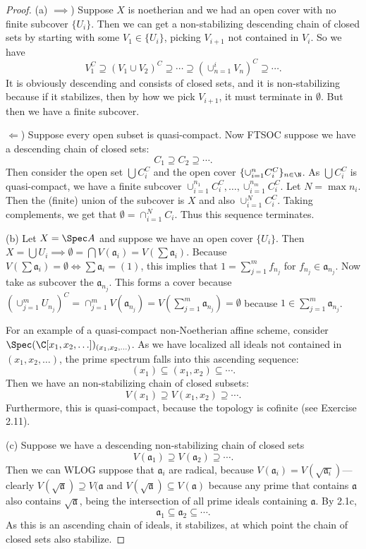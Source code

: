 \begin{proof}
	(a) $\implies $) Suppose $X $ is noetherian and we had an open cover with no finite subcover $\{U_i\}  $.
	Then we can get a non-stabilizing descending chain of closed sets by starting with some $V_1 \in \{U_i\}   $, picking $V_{i+1} $ not contained in $V_i $.
	So we have
	\[
		V_1^C \supseteq (V_1\cup V_{2})^C \supseteq \cdots \supseteq (\cup_{n = 1}^i V_n)^C \supseteq \cdots
	.\] 
	It is obviously descending and consists of closed sets, and it is non-stabilizing because if it stabilizes, then by how we pick $V_{i+1} $, it must terminate in $\emptyset $.
	But then we have a finite subcover.

	$\Leftarrow $) Suppose every open subset is quasi-compact.
	Now FTSOC suppose we have a descending chain of closed sets:
	\[
		C_{1} \supseteq C_{2} \supseteq \cdots
	.\] 
	Then consider the open set $\bigcup C_i^C $ and the open cover $\{\cup_{i=1}^n C_i^C\}_{n\in \N}   $.
	As $\bigcup C_i^C $ is quasi-compact, we have a finite subcover $\cup_{i=1}^{n_1} C_i^C, \ldots, \cup_{i=1}^{n_m}C_i^C $.
	Let $N = \max n_i $.
	Then the (finite) union of the subcover is $X $ and also $\cup_{i=1}^N C_i^C$.
	Taking complements, we get that $\emptyset = \cap_{i=1}^N C_i $.
	Thus this sequence terminates.

	(b) Let $X = \Spec A $ and suppose we have an open cover $\{U_i\} $.
	Then $X = \bigcup U_i \implies \emptyset = \bigcap V(\mathfrak{a}_i) = V(\sum \mathfrak{a}_i)$.
	Because $V(\sum \mathfrak{a}_i) = \emptyset \iff \sum \mathfrak{a}_i = (1) $, this implies that $1 = \sum_{j=1}^m f_{n_j} $ for $f_{n_j} \in \mathfrak{a}_{n_j} $.
	Now take as subcover the $\mathfrak{a}_{n_j} $.
	This forms a cover because $(\cup_{j=1}^m U_{n_j})^C = \cap_{j=1}^m V(\mathfrak{a}_{n_j}) = V(\sum_{j=1}^m \mathfrak{a}_{n_j}) = \emptyset$ because $1 \in \sum_{j=1}^m \mathfrak{a}_{n_j} $.

	For an example of a quasi-compact non-Noetherian affine scheme, consider $\Spec (\C[x_{1},x_{2},\ldots])_{(x_{1},x_{2},\ldots)} $.
	As we have localized all ideals not contained in $(x_{1},x_{2},\ldots) $, the prime spectrum falls into this ascending sequence:
	\[
		(x_{1}) \subseteq (x_{1},x_{2}) \subseteq \cdots
	.\] 
	Then we have an non-stabilizing chain of closed subsets:
	\[
		V(x_{1}) \supseteq V(x_{1},x_{2}) \supseteq \cdots
	.\] 
	Furthermore, this is quasi-compact, because the topology is cofinite (see Exercise 2.11).

	(c) Suppose we have a descending non-stabilizing chain of closed sets
	\[
		V(\mathfrak{a}_1) \supseteq V(\mathfrak{a}_2) \supseteq \cdots
	.\] 
	Then we can WLOG suppose that $\mathfrak{a}_i $ are radical, because $V(\mathfrak{a}_i) = V(\sqrt{\mathfrak{a}_i}) $---clearly $V(\sqrt{\mathfrak{a}} ) \supseteq V(\mathfrak{a} $ and $V(\sqrt{\mathfrak{a}} ) \subseteq V(\mathfrak{a}) $ because any prime that contains $\mathfrak{a} $ also contains $\sqrt{\mathfrak{a}}  $, being the intersection of all prime ideals containing $\mathfrak{a} $.
	By 2.1c,
	\[
		\mathfrak{a}_1 \subseteq \mathfrak{a}_2 \subseteq \cdots
	.\] 
	As this is an ascending chain of ideals, it stabilizes, at which point the chain of closed sets also stabilize.


\end{proof}
